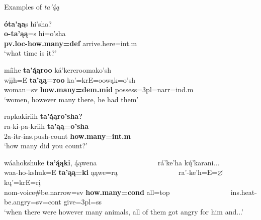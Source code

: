 \begin{exe}

\item\label{ExamplesOfTaAa} Examples of \textit{ta'ą́ą}

\begin{xlist}

\item\label{ExamplesOfTaAa1} \glll \textbf{óta'ąa}̨s hi'sha?\\
    \textbf{o-ta'ąą}=s hi=o'sha\\
    \textbf{pv.loc-\textnormal{\bfseries how.many}=def} \textnormal{arrive.here}=int.m\\
    \glt `what time is it?' \citep[10]{kasak2014}
    
\item\label{ExamplesOfTaAa2} \glll míihe \textbf{ta'ą́ąroo} ká'kereroomako'sh\\
    wįįh=E \textbf{ta'ąą=roo} ka'=krE=oowąk=o'sh\\
    \textnormal{woman}=sv \textbf{\textnormal{\bfseries how.many}=dem.mid} \textnormal{possess}=3pl=narr=ind.m\\
    \glt `women, however many there, he had them' \citep[76]{hollow1973b}
    
\item\label{ExamplesOfTaAa3} \glll rapkakiriih \textbf{ta'ą́ąro'sha?}\\
    ra-ki-pa-kriih \textbf{ta'ąą=o'sha}\\
    2a-itr-ins.push-\textnormal{count} \textbf{\textnormal{\bfseries how.many}=int.m}\\
    \glt `how many did you count?' \citep[243]{trechter2012}
    
\item\label{ExamplesOfTaAa4} \glll wáahokshuke \textbf{ta'ą́ąki}, ą́ąwena ~ ~ ~ ~ ~ ~ ~ ~ ~ ~  rá'ke'ha kų́'karani...\\
    waa-ho-kshuk=E \textbf{ta'ąą=ki} ąąwe=rą ~ ~ ~ ~ ~ ~ ~ ~ ~ ~  ra'-ke'h=E=$\varnothing$ kų'=krE=rį\\
    nom-\textnormal{voice}\#\textnormal{be.narrow}=sv \textbf{\textnormal{\bfseries how.many}=cond} \textnormal{all}=top ~ ~ ~ ~ ~ ~ ~ ~ ~ ~  ins.heat-\textnormal{be.angry}=sv=cont \textnormal{give}=3pl=ss\\
    \glt `when there were however many animals, all of them got angry for him and...' \citep[43]{hollow1973a}


\end{xlist}

\end{exe}


